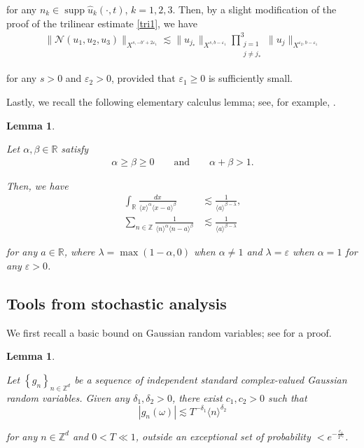 \documentclass[%
11pt,  reqno]{amsart}
\newtheorem{lemma}[theorem]{Lemma}
\DeclareMathOperator*{\supp}{supp}
\newcommand{\1}{\hspace{0.2mm}\text{I}\hspace{0.2mm}}
\newcommand{\noi}{\noindent}
\newcommand{\Z}{\mathbb{Z}}
\newcommand{\R}{\mathbb{R}}
\newcommand{\al}{\alpha}
\newcommand{\be}{\beta}
\newcommand{\dl}{\delta}
\newcommand{\eps}{\varepsilon}
\newcommand{\ld}{\lambda}
\newcommand{\ft}{\widehat}
\newcommand{\les}{\lesssim}
\newcommand{\jb}[1]
{\langle #1 \rangle}
\newcommand{\NN}{\mathcal{N}}
\numberwithin{equation}{section}
\numberwithin{theorem}{section}
\begin{document}
\noi
for any $n_k \in \supp \ft u_k(\cdot, t)$,  $k = 1, 2, 3$.
Then, by a slight modification of the proof of 
the trilinear estimate \eqref{tri1}, we have 
\begin{align}
\| \NN(u_1, u_2, u_3)\|_{X^{s, - b' + 2\eps_1 }} \les 
\|u_{j_*}\|_{X^{s, b-\eps_1}}
 \prod_{\substack{j = 1 \\j \ne j_*}}^3 \| u_j\|_{X^{\eps_2, b - \eps_1}}
\label{tri3}
\end{align}

\noi
for any    $s > 0$  and $ \eps_2 > 0$, 
provided that $\eps_1 \ge 0$ is sufficiently small.


\medskip


Lastly, we recall the following elementary calculus
lemma; see, for example,  \cite[Lemma~4.2]{GTV}.

\begin{lemma}
\label{LEM:conv}

Let  $\al, \be \in \R$ satisfy
\begin{align*}
 \al \ge \be \ge 0 \qquad \text{and}\qquad   \al+ \be > 1.
\end{align*}


\noi
Then, we have
\begin{align*}
\int_\R\frac{dx}{\jb{x}^\al \jb{x-a}^\be}
& \les \frac 1{\jb{a}^{ \be - \ld}},\\ 
 \sum_{n \in \Z} \frac{1}{\jb{n}^\al \jb{n - a}^\be}
& \les \frac 1{\jb{a}^{ \be - \ld}}
\end{align*}







\noi
for any $a \in \R$,
where $\ld = 
\max( 1- \al, 0)$ when $\al\ne 1$ and $\ld = \eps$ when $\al = 1$ for any $\eps > 0$.


\end{lemma}




\subsection{Tools from stochastic analysis}


We first recall a basic bound
on Gaussian random variables;
see \cite[Lemma 3.4]{CO}
for a proof.

\begin{lemma}
\label{LEM:prob1} 

Let $\left\{g_n\right\}_{n\in \Z^d}$ be a sequence of independent standard complex-valued Gaussian
random variables. 
Given any $\dl_1, \dl_2 > 0$, there
exist $c_1, c_2 > 0$ such that 
\begin{equation*}
|g_n(\omega)| \les T^{-\dl_1} \jb{n}^{\dl_2}
\end{equation*}
	
\noi 
for any $n \in \Z^d$ and $0 < T \ll 1$, 
outside an exceptional set of probability $< e^{-\frac{c_1}{T^{c_2}}}$. 
\end{lemma}
\end{document}
